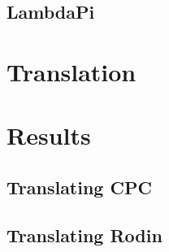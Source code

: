 \documentclass[lualatex, compress, 12pt, handout]{beamer}
\begin{document}
\subsection{LambdaPi}

\section{Translation}

\section{Results}

\subsection{Translating CPC}

\subsection{Translating Rodin}










\end{document}
